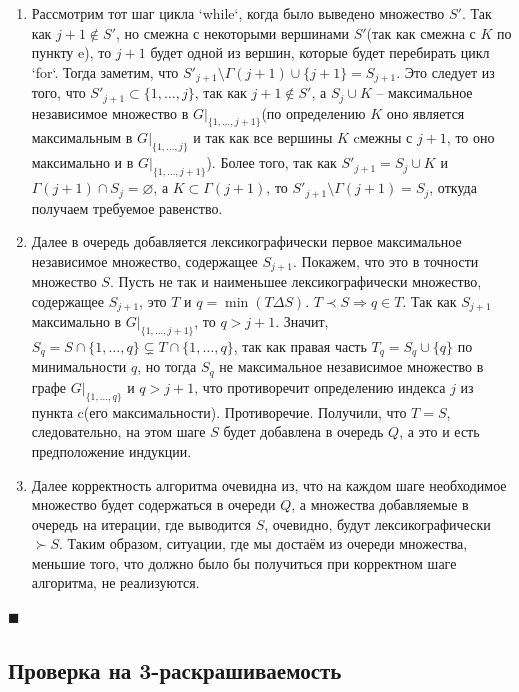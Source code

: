 \documentclass{article}
\begin{document}
\begin{enumerate}
\begin{enumerate}
\item Рассмотрим тот шаг цикла `while`, когда было выведено множество $S'$. Так как $j + 1\not\in S'$, но смежна с некоторыми вершинами $S'$(так как смежна с $K$ по пункту e), то $j + 1$ будет
одной из вершин, которые будет перебирать цикл `for`. Тогда заметим, что $S'_{j + 1}\setminus \Gamma(j + 1) \cup \{j + 1\} = S_{j + 1}$. Это следует из того, что $S'_{j + 1} \subset \{1, \hdots, j\}$,
так как $j + 1\not\in S'$, а $S_j\cup K$ -- максимальное независимое множество в $G|_{\{1, \hdots, j + 1\}}$(по определению $K$ оно является максимальным
в $G|_{\{1, \hdots, j\}}$ и так как все вершины $K$ cмежны с $j + 1$, то оно максимально и в $G|_{\{1, \hdots, j + 1\}}$). Более того, так как $S'_{j + 1} = S_j\cup K$ и $\Gamma(j + 1)\cap S_j = \varnothing$,
а $K\subset \Gamma(j + 1)$, то $S'_{j + 1}\setminus\Gamma(j + 1) = S_j$, откуда получаем требуемое равенство.
\item Далее в очередь добавляется лексикографически первое максимальное независимое множество, содержащее $S_{j + 1}$. Покажем, что это в точности множество $S$. Пусть не так и наименьшее
лексикографически множество, содержащее $S_{j + 1}$, это $T$ и $q = \min(T\Delta S)$. $T\prec S\Rightarrow q\in T$. Так как $S_{j + 1}$ максимально в $G|_{\{1, \hdots, j + 1\}}$, то $q > j + 1$. Значит,
$S_q = S\cap\{1, \hdots, q\}\subsetneq T\cap\{1, \hdots, q\}$, так как правая часть $T_q = S_q\cup\{q\}$ по минимальности $q$, но тогда $S_q$ не максимальное независимое множество в графе
$G|_{\{1, \hdots, q\}}$ и $q > j + 1$, что противоречит определению индекса $j$ из пункта c(его максимальности). Противоречие. Получили, что $T=S$, следовательно, на этом
шаге $S$ будет добавлена в очередь $Q$, а это и есть предположение индукции.
\item Далее корректность алгоритма очевидна из, что на каждом шаге необходимое множество будет содержаться в очереди $Q$, а множества добавляемые в очередь на итерации, где выводится $S$, очевидно, будут
лексикографически $\succ S$. Таким образом, ситуации, где мы достаём из очереди множества, меньшие того, что должно было бы получиться при корректном шаге алгоритма, не реализуются.
\end{enumerate}
\end{enumerate}
\begin{flushright} $\blacksquare$ \end{flushright}

\subsection{Проверка на 3-раскрашиваемость}
\end{document}
